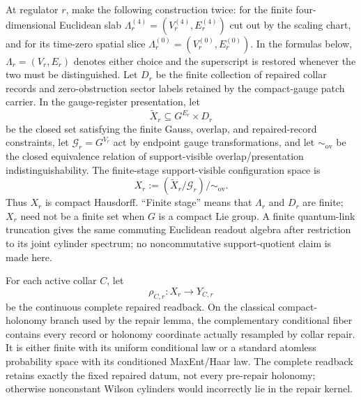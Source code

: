 \begin{definition}
\label{def:finite-compact-gauge-cylinder-system}
At regulator \(r\), make the following construction twice: for the finite four-dimensional
Euclidean slab \(\Lambda_r^{(4)}=(V_r^{(4)},E_r^{(4)})\) cut out by the scaling chart, and for its
time-zero spatial slice \(\Lambda_r^{(0)}=(V_r^{(0)},E_r^{(0)})\). In the formulas below,
\(\Lambda_r=(V_r,E_r)\) denotes either choice and the superscript is restored whenever the two
must be distinguished. Let \(D_r\) be the finite collection of repaired collar records and
zero-obstruction sector labels retained by the compact-gauge patch carrier. In the gauge-register
presentation, let
\[
\widetilde X_r\subseteq G^{E_r}\times D_r
\]
be the closed set satisfying the finite Gauss, overlap, and repaired-record constraints, let
\(\mathcal G_r=G^{V_r}\) act by endpoint gauge transformations, and let
\(\sim_{\mathrm{ov}}\) be the closed equivalence relation of support-visible
overlap/presentation indistinguishability. The finite-stage support-visible configuration space is
\[
X_r:=(\widetilde X_r/\mathcal G_r)/{\sim_{\mathrm{ov}}}.
\]
Thus \(X_r\) is compact
Hausdorff. ``Finite stage'' means that \(\Lambda_r\) and \(D_r\) are finite; \(X_r\) need not be
a finite set when \(G\) is a compact Lie group. A finite quantum-link truncation gives the same
commuting Euclidean readout algebra after restriction to its joint cylinder spectrum; no
noncommutative support-quotient claim is made here.

For each active collar \(C\), let
\[
\rho_{C,r}:X_r\longrightarrow Y_{C,r}
\]
be the continuous complete repaired readback. On the classical compact-holonomy branch used by
the repair lemma, the complementary conditional fiber contains every record or holonomy coordinate
actually resampled by collar repair. It is either finite with its uniform conditional law or a
standard atomless probability space with its conditioned MaxEnt/Haar law. The complete readback
retains exactly the fixed repaired datum, not every pre-repair holonomy; otherwise nonconstant
Wilson cylinders would incorrectly lie in the repair kernel.


\end{definition}
